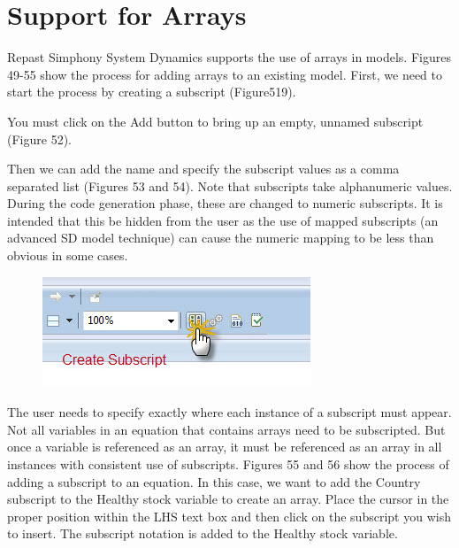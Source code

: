 \documentclass[11pt]{amsart}
\begin{document}
\section{Support for Arrays}
Repast Simphony System Dynamics supports the use of arrays in models. Figures 49-55 show the process for adding arrays to an existing model. First, we need to start the process by creating a subscript (Figure519).


You must click on the Add button to bring up an empty, unnamed subscript (Figure 52).


Then we can add the name and specify the subscript values as a comma separated list (Figures 53 and 54). Note that subscripts take alphanumeric values. During the code generation phase, these are changed to numeric subscripts. It is intended that this be hidden from the user as the use of mapped subscripts (an advanced SD model technique) can cause the numeric mapping to be less than obvious in some cases.


\begin{figure}[ht]
\begin{center}
\vspace{.2in}
\centerline {
\includegraphics[totalheight=0.3\textheight]{images/052.jpg}
}
\caption{}
\label{fig:052}
\end{center}
\end{figure}

The user needs to specify exactly where each instance of a subscript must appear. Not all variables in an equation that contains arrays need to be subscripted. But once a variable is referenced as an array, it must be referenced as an array in all instances with consistent use of subscripts. Figures 55 and 56 show the process of adding a subscript to an equation. In this case, we want to add the Country subscript to the Healthy stock variable to create an array. Place the cursor in the proper position within the LHS text box and then click on the subscript you wish to insert. The subscript notation is added to the Healthy stock variable.
\end{document}
